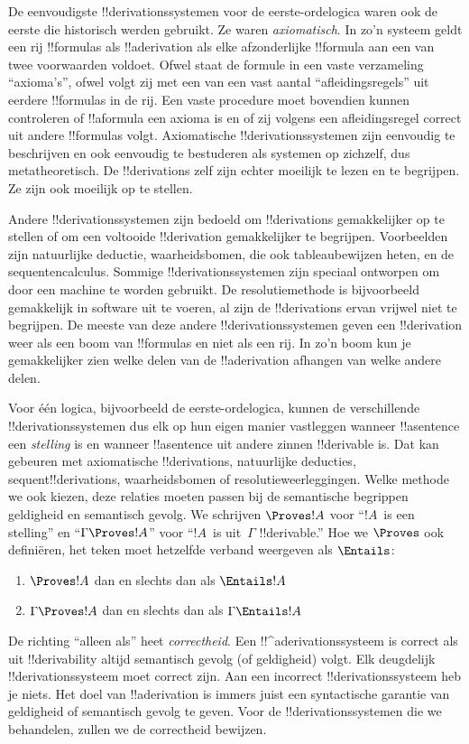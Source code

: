 \documentclass[openany]{memoir}
\begin{document}
De eenvoudigste !!{derivation}ssystemen voor de eerste-ordelogica waren
ook de eerste die historisch werden gebruikt. Ze waren
\emph{axiomatisch}. In zo'n systeem geldt een rij !!{formula}s als
!!a{derivation} als elke afzonderlijke !!{formula} aan een van twee
voorwaarden voldoet. Ofwel staat de formule in een vaste verzameling
``axioma's'', ofwel volgt zij met een van een vast aantal
``afleidingsregels'' uit eerdere !!{formula}s in de rij. Een vaste
procedure moet bovendien kunnen controleren of !!a{formula} een axioma
is en of zij volgens een afleidingsregel correct uit andere
!!{formula}s volgt. Axiomatische !!{derivation}ssystemen zijn eenvoudig
te beschrijven en ook eenvoudig te bestuderen als systemen op zichzelf,
dus metatheoretisch. De !!{derivation}s
zelf zijn echter moeilijk te lezen en te begrijpen. Ze zijn ook
moeilijk op te stellen.

Andere !!{derivation}ssystemen zijn bedoeld om !!{derivation}s
gemakkelijker op te stellen of om een voltooide !!{derivation}
gemakkelijker te begrijpen. Voorbeelden zijn natuurlijke deductie,
waarheidsbomen, die ook tableaubewijzen heten, en de sequentencalculus.
Sommige !!{derivation}ssystemen zijn speciaal ontworpen om door een
machine te worden gebruikt. De resolutiemethode is bijvoorbeeld
gemakkelijk in software uit te voeren, al zijn de !!{derivation}s
ervan vrijwel niet te begrijpen. De meeste van deze andere
!!{derivation}ssystemen geven een !!{derivation} weer als een boom van
!!{formula}s en niet als een rij. In zo'n boom kun je gemakkelijker
zien welke delen van de !!a{derivation} afhangen van welke andere
delen.

Voor één logica, bijvoorbeeld de eerste-ordelogica, kunnen de
verschillende !!{derivation}ssystemen dus elk op hun eigen manier
vastleggen wanneer !!a{sentence} een \emph{stelling} is en wanneer
!!a{sentence} uit andere zinnen !!{derivable} is. Dat kan gebeuren met
axiomatische !!{derivation}s, natuurlijke deducties,
sequent!!{derivation}s, waarheidsbomen of resolutieweerleggingen. Welke
methode we ook kiezen, deze relaties moeten passen bij de semantische
begrippen geldigheid en semantisch gevolg. We schrijven $\Proves !A$
voor ``$!A$~is een stelling'' en ``$\Gamma \Proves !A$'' voor
``$!A$~is uit~$\Gamma$ !!{derivable}.'' Hoe we $\Proves$ ook
definiëren, het teken moet hetzelfde verband weergeven als $\Entails$:
\begin{enumerate}
\item $\Proves !A$ dan en slechts dan als $\Entails !A$
\item $\Gamma \Proves !A$ dan en slechts dan als $\Gamma \Entails !A$
\end{enumerate}
De richting ``alleen als'' heet \emph{correctheid}. Een
!!^a{derivation}ssysteem is correct als uit !!{derivability} altijd
semantisch gevolg (of geldigheid) volgt. Elk deugdelijk
!!{derivation}ssysteem moet correct zijn. Aan een incorrect
!!{derivation}ssysteem heb je niets. Het doel van !!a{derivation} is
immers juist een syntactische garantie van geldigheid of semantisch
gevolg te geven. Voor de !!{derivation}ssystemen die we behandelen,
zullen we de correctheid bewijzen.
\end{document}

